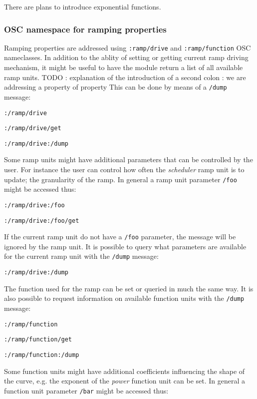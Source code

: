 \documentclass{NIME-alternate}
\begin{document}
There are plans to introduce exponential functions.




\subsubsection{OSC namespace for ramping properties} %
\label{ssub:osc_namespace_for_ramping_properties}

Ramping properties are addressed using \texttt{:ramp/drive} and \texttt{:ramp/function} OSC nameclasses. In addition to the ablity of setting or getting current ramp driving mechanism, it might be useful to have the module return a list of all available ramp units. 
TODO : explanation of the introduction of a second colon : we are addressing a property of property 
This can be done by means of a \texttt{/dump} message:

\texttt{:/ramp/drive}

\texttt{:/ramp/drive/get}

\texttt{:/ramp/drive:/dump}

Some ramp units might have additional parameters that can be controlled by the user. For instance the user can control how often the \emph{scheduler} ramp unit is to update; the granularity of the ramp.  In general a ramp unit parameter \texttt{/foo} might be accessed thus:


\texttt{:/ramp/drive:/foo}

\texttt{:/ramp/drive:/foo/get}

If the current ramp unit do not have a \texttt{/foo} parameter, the message will be ignored by the ramp unit. It is possible to query what parameters are available for the current ramp unit with the \texttt{/dump} message:

\texttt{:/ramp/drive:/dump}

The function used for the ramp can be set or queried in much the same way. It is also possible to request information on available function units with the \texttt{/dump} message:

\texttt{:/ramp/function}

\texttt{:/ramp/function/get}

\texttt{:/ramp/function:/dump}

Some function units might have additional coefficients influencing the shape of the curve, e.g. the exponent of the \emph{power} function unit can be set. In general a function unit parameter \texttt{/bar} might be accessed thus:
\end{document}

